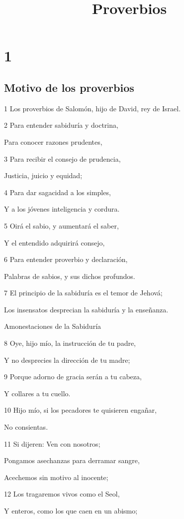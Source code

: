 

\title{Proverbios}

\chapter{1}

\section*{Motivo de los proverbios}

\par 1 Los proverbios de Salomón, hijo de David, rey de Israel.
\par 2 Para entender sabiduría y doctrina,
\par Para conocer razones prudentes,
\par 3 Para recibir el consejo de prudencia,
\par Justicia, juicio y equidad;
\par 4 Para dar sagacidad a los simples,
\par Y a los jóvenes inteligencia y cordura.
\par 5 Oirá el sabio, y aumentará el saber,
\par Y el entendido adquirirá consejo,
\par 6 Para entender proverbio y declaración,
\par Palabras de sabios, y sus dichos profundos.
\par 7 El principio de la sabiduría es el temor de Jehová; 
\par Los insensatos desprecian la sabiduría y la enseñanza.
\par Amonestaciones de la Sabiduría
\par 8 Oye, hijo mío, la instrucción de tu padre,
\par Y no desprecies la dirección de tu madre;
\par 9 Porque adorno de gracia serán a tu cabeza, 
\par Y collares a tu cuello.
\par 10 Hijo mío, si los pecadores te quisieren engañar, 
\par No consientas. 
\par 11 Si dijeren: Ven con nosotros;
\par Pongamos asechanzas para derramar sangre,
\par Acechemos sin motivo al inocente;
\par 12 Los tragaremos vivos como el Seol,
\par Y enteros, como los que caen en un abismo;
